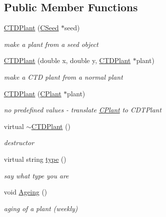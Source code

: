 \subsection*{Public Member Functions}
\begin{DoxyCompactItemize}
\item 
\mbox{\hyperlink{class_c_t_d_plant_ad106f3466ae0f30e6d84c3bfe71dd4db}{C\+T\+D\+Plant}} (\mbox{\hyperlink{class_c_seed}{C\+Seed}} $\ast$seed)
\begin{DoxyCompactList}\small\item\em make a plant from a seed object \end{DoxyCompactList}\item 
\mbox{\hyperlink{class_c_t_d_plant_a674b0f94440fee06d71bb4d161a0bc66}{C\+T\+D\+Plant}} (double x, double y, \mbox{\hyperlink{class_c_t_d_plant}{C\+T\+D\+Plant}} $\ast$plant)
\begin{DoxyCompactList}\small\item\em make a C\+TD plant from a normal plant \end{DoxyCompactList}\item 
\mbox{\hyperlink{class_c_t_d_plant_a40351d1506a0032e241dbf8dfedef569}{C\+T\+D\+Plant}} (\mbox{\hyperlink{class_c_plant}{C\+Plant}} $\ast$plant)
\begin{DoxyCompactList}\small\item\em no predefined values -\/ translate \mbox{\hyperlink{class_c_plant}{C\+Plant}} to C\+D\+T\+Plant \end{DoxyCompactList}\item 
virtual \mbox{\hyperlink{class_c_t_d_plant_a47b82e5be7be1ff3e8670229a68d053d}{$\sim$\+C\+T\+D\+Plant}} ()
\begin{DoxyCompactList}\small\item\em destructor \end{DoxyCompactList}\item 
virtual string \mbox{\hyperlink{class_c_t_d_plant_a4bed9454fd2fd6fa37109b544017361b}{type}} ()
\begin{DoxyCompactList}\small\item\em say what type you are \end{DoxyCompactList}\item 
\mbox{\label{class_c_t_d_plant_a4fedbe1ad644b4f4fd0e8f687ea92810}} 
void \mbox{\hyperlink{class_c_t_d_plant_a4fedbe1ad644b4f4fd0e8f687ea92810}{Ageing}} ()
\begin{DoxyCompactList}\small\item\em aging of a plant (weekly) \end{DoxyCompactList}\item 

\end{DoxyCompactItemize}
